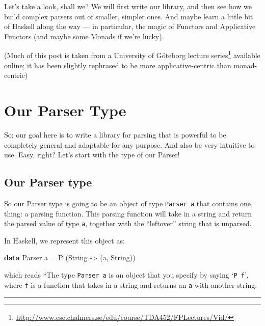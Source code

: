 \documentclass[]{article}
\newenvironment{Shaded}{}{}
\newcommand{\KeywordTok}[1]{\textcolor[rgb]{0.00,0.44,0.13}{\textbf{{#1}}}}
\newcommand{\DataTypeTok}[1]{\textcolor[rgb]{0.56,0.13,0.00}{{#1}}}
\newcommand{\OtherTok}[1]{\textcolor[rgb]{0.00,0.44,0.13}{{#1}}}
\newcommand{\FunctionTok}[1]{\textcolor[rgb]{0.02,0.16,0.49}{{#1}}}
\newcommand{\NormalTok}[1]{{#1}}
\renewcommand{\href}[2]{#2\footnote{\url{#1}}}
\begin{document}
Let's take a look, shall we? We will first write our library, and then
see how we build complex parsers out of smaller, simpler ones. And maybe
learn a little bit of Haskell along the way --- in particular, the magic
of Functors and Applicative Functors (and maybe some Monads if we're
lucky).

(Much of this post is taken from a University of Göteborg
\href{http://www.cse.chalmers.se/edu/course/TDA452/FPLectures/Vid/}{lecture
series} available online; it has been slightly rephrased to be more
applicative-centric than monad-centric)

\section{Our Parser Type}\label{our-parser-type}

So; our goal here is to write a library for parsing that is powerful to
be completely general and adaptable for any purpose. And also be very
intuitive to use. Easy, right? Let's start with the type of our Parser!

\subsection{Our Parser type}\label{our-parser-type-1}

So our Parser type is going to be an object of type \texttt{Parser\ a}
that contains one thing: a parsing function. This parsing function will
take in a string and return the parsed value of type \texttt{a},
together with the ``leftover'' string that is unparsed.

In Haskell, we represent this object as:

\begin{Shaded}
\begin{Highlighting}[]
\KeywordTok{data} \DataTypeTok{Parser} \NormalTok{a }\FunctionTok{=} \DataTypeTok{P} \NormalTok{(}\DataTypeTok{String} \OtherTok{->} \NormalTok{(a, }\DataTypeTok{String}\NormalTok{))}
\end{Highlighting}
\end{Shaded}

which reads ``The type \texttt{Parser\ a} is an object that you specify
by saying `\texttt{P\ f}', where \texttt{f} is a function that takes in
a string and returns an \texttt{a} with another string.

\begin{center}\rule{0.5\linewidth}{\linethickness}\end{center}
\end{document}
